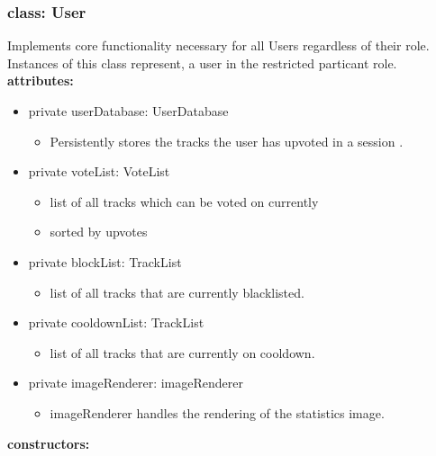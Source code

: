 \documentclass[oneside, ngerman]{sdqtechreport}
\begin{document}
\subsubsection{class: User}
Implements core functionality necessary for all Users regardless of their role.
Instances of this class represent, a user in the restricted particant role.
\textbf{attributes:}
\begin{itemize}
    \item private userDatabase: UserDatabase
    \begin{itemize}
        \item Persistently stores the tracks the user has upvoted in a session .
    \end{itemize}
    \item private  voteList: VoteList 
    \begin{itemize}
        \item list of all tracks which can be voted on currently
        \item sorted by upvotes 
    \end{itemize}
    \item private blockList: TrackList
    \begin{itemize}
        \item list of all tracks that are currently blacklisted.
    \end{itemize}
    \item private cooldownList: TrackList
    \begin{itemize}
        \item list of all tracks that are currently on cooldown.
    \end{itemize}
    \item private imageRenderer: imageRenderer
    \begin{itemize}
        \item imageRenderer handles the rendering of the statistics image.
    \end{itemize}
\end{itemize}
\textbf{constructors:}
\end{document}
